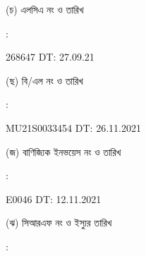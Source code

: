 \documentclass[12pt]{article}
\newcommand{\lcdt}{27.09.21}
\newcommand{\lcano}{268647}
\newcommand{\lcadt}{{\lcdt}}
\newcommand{\invno}{E0046}
\newcommand{\invdt}{12.11.2021}
\newcommand{\blno}{MU21S0033454}
\newcommand{\bldt}{26.11.2021}
\begin{document}
\begin{minipage}[t]{0.05\linewidth}
\hspace*{1em}
\end{minipage}
\begin{minipage}[t]{0.40\linewidth}
(চ) এলসিএ নং ও তারিখ
\end{minipage}
\begin{minipage}[t]{0.02\linewidth}
:
\end{minipage}
\begin{minipage}[t]{0.53\linewidth}
{\lcano} \hspace{2em} DT: {\lcadt}
\\
\end{minipage}
\begin{minipage}[t]{0.05\linewidth}
\hspace*{1em}
\end{minipage}
\begin{minipage}[t]{0.40\linewidth}
(ছ) বি/এল নং ও তারিখ
\end{minipage}
\begin{minipage}[t]{0.02\linewidth}
:
\end{minipage}
\begin{minipage}[t]{0.53\linewidth}
{\blno} \hspace{2em} DT: {\bldt}
\\
\end{minipage}
\begin{minipage}[t]{0.05\linewidth}
\hspace*{1em}
\end{minipage}
\begin{minipage}[t]{0.40\linewidth}
(জ) বাণিজ্যিক ইনভয়েস নং ও তারিখ
\end{minipage}
\begin{minipage}[t]{0.02\linewidth}
:
\end{minipage}
\begin{minipage}[t]{0.53\linewidth}
{\invno} \hspace{2em} DT: {\invdt}
\\
\end{minipage}
\begin{minipage}[t]{0.05\linewidth}
\hspace*{1em}
\end{minipage}
\begin{minipage}[t]{0.40\linewidth}
(ঝ) সিআরএফ নং ও ইস্যুর তারিখ
\end{minipage}
\begin{minipage}[t]{0.02\linewidth}
:
\end{minipage}
\end{document}

